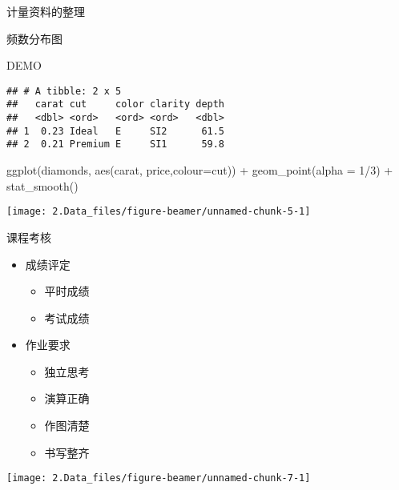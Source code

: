 \documentclass[
  10pt,
  ignorenonframetext,
]{beamer}
\newenvironment{Shaded}{\begin{snugshade}}{\end{snugshade}}
\newcommand{\AttributeTok}[1]{\textcolor[rgb]{0.77,0.63,0.00}{#1}}
\newcommand{\DecValTok}[1]{\textcolor[rgb]{0.00,0.00,0.81}{#1}}
\newcommand{\FunctionTok}[1]{\textcolor[rgb]{0.00,0.00,0.00}{#1}}
\newcommand{\NormalTok}[1]{#1}
\newcommand{\SpecialCharTok}[1]{\textcolor[rgb]{0.00,0.00,0.00}{#1}}
\providecommand{\tightlist}{%
  \setlength{\itemsep}{0pt}\setlength{\parskip}{0pt}}
\begin{document}
\begin{frame}{计量资料的整理}
\protect\hypertarget{ux8ba1ux91cfux8d44ux6599ux7684ux6574ux7406}{}
\end{frame}

\begin{frame}{频数分布图}
\protect\hypertarget{ux9891ux6570ux5206ux5e03ux56fe}{}
\end{frame}

\begin{frame}[fragile]{DEMO}
\protect\hypertarget{demo}{}
\begin{verbatim}
## # A tibble: 2 x 5
##   carat cut     color clarity depth
##   <dbl> <ord>   <ord> <ord>   <dbl>
## 1  0.23 Ideal   E     SI2      61.5
## 2  0.21 Premium E     SI1      59.8
\end{verbatim}

\begin{Shaded}
\begin{Highlighting}[]
\FunctionTok{ggplot}\NormalTok{(diamonds, }\FunctionTok{aes}\NormalTok{(carat, price,}\AttributeTok{colour=}\NormalTok{cut)) }\SpecialCharTok{+}
  \FunctionTok{geom\_point}\NormalTok{(}\AttributeTok{alpha =} \DecValTok{1}\SpecialCharTok{/}\DecValTok{3}\NormalTok{) }\SpecialCharTok{+} 
  \FunctionTok{stat\_smooth}\NormalTok{()}
\end{Highlighting}
\end{Shaded}

\begin{center}\texttt{[image: 2.Data\_files/figure-beamer/unnamed-chunk-5-1]} \end{center}
\end{frame}

\begin{frame}{课程考核}
\protect\hypertarget{ux8bfeux7a0bux8003ux6838}{}
\begin{itemize}
\tightlist
\item
  成绩评定

  \begin{itemize}
  \tightlist
  \item
    平时成绩
  \item
    考试成绩
  \end{itemize}
\item
  作业要求

  \begin{itemize}
  \tightlist
  \item
    独立思考
  \item
    演算正确
  \item
    作图清楚
  \item
    书写整齐
  \end{itemize}
\end{itemize}

\begin{center}\texttt{[image: 2.Data\_files/figure-beamer/unnamed-chunk-7-1]} \end{center}
\end{frame}
\end{document}
